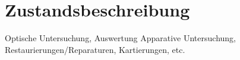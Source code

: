 \chapter{Zustandsbeschreibung}

Optische Untersuchung, Auswertung Apparative Untersuchung, Restaurierungen/Reparaturen, Kartierungen, etc.




